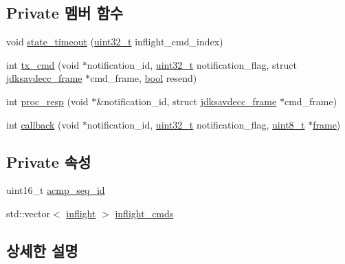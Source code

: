 \subsection*{Private 멤버 함수}
\begin{DoxyCompactItemize}
\item 
void \hyperlink{classavdecc__lib_1_1acmp__controller__state__machine_a1e6e8844609ddaee9d544e95210c495c}{state\+\_\+timeout} (\hyperlink{parse_8c_a6eb1e68cc391dd753bc8ce896dbb8315}{uint32\+\_\+t} inflight\+\_\+cmd\+\_\+index)
\item 
int \hyperlink{classavdecc__lib_1_1acmp__controller__state__machine_a1a1c2c9ae3773c01cbad352f2a2c2dfc}{tx\+\_\+cmd} (void $\ast$notification\+\_\+id, \hyperlink{parse_8c_a6eb1e68cc391dd753bc8ce896dbb8315}{uint32\+\_\+t} notification\+\_\+flag, struct \hyperlink{structjdksavdecc__frame}{jdksavdecc\+\_\+frame} $\ast$cmd\+\_\+frame, \hyperlink{avb__gptp_8h_af6a258d8f3ee5206d682d799316314b1}{bool} resend)
\item 
int \hyperlink{classavdecc__lib_1_1acmp__controller__state__machine_a81d345252361d6b1650316379916ccf6}{proc\+\_\+resp} (void $\ast$\&notification\+\_\+id, struct \hyperlink{structjdksavdecc__frame}{jdksavdecc\+\_\+frame} $\ast$cmd\+\_\+frame)
\item 
int \hyperlink{classavdecc__lib_1_1acmp__controller__state__machine_a5803ae7099ff1a9c0721244e3d9b77b4}{callback} (void $\ast$notification\+\_\+id, \hyperlink{parse_8c_a6eb1e68cc391dd753bc8ce896dbb8315}{uint32\+\_\+t} notification\+\_\+flag, \hyperlink{stdint_8h_aba7bc1797add20fe3efdf37ced1182c5}{uint8\+\_\+t} $\ast$\hyperlink{gst__avb__playbin_8c_ac8e710e0b5e994c0545d75d69868c6f0}{frame})
\end{DoxyCompactItemize}
\subsection*{Private 속성}
\begin{DoxyCompactItemize}
\item 
uint16\+\_\+t \hyperlink{classavdecc__lib_1_1acmp__controller__state__machine_abc8353807adf298f195ae2f0dc170b51}{acmp\+\_\+seq\+\_\+id}
\item 
std\+::vector$<$ \hyperlink{classavdecc__lib_1_1inflight}{inflight} $>$ \hyperlink{classavdecc__lib_1_1acmp__controller__state__machine_a0475b054c1890c88809394d9cef2a4c0}{inflight\+\_\+cmds}
\end{DoxyCompactItemize}


\subsection{상세한 설명}


